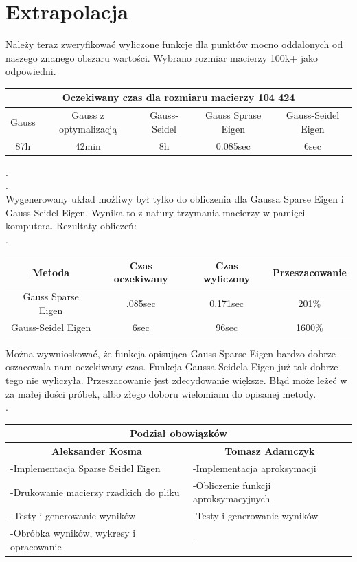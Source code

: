\documentclass[8pt]{article}
\begin{document}
\section*{Extrapolacja}
Należy teraz zweryfikować wyliczone funkcje dla punktów mocno oddalonych od naszego znanego obszaru wartości. Wybrano rozmiar macierzy 100k+ jako odpowiedni.
\begin{center}
\begin{tabular}{ | c | c | c | c | c | }
  \hline
  \multicolumn{5}{|c|}{\textbf{Oczekiwany czas dla rozmiaru macierzy 104 424}} \\
  \hline
  Gauss & Gauss z optymalizacją & Gauss-Seidel &Gauss Sprase Eigen &Gauss-Seidel Eigen \\\hline
  87h & 42min & 8h &0.085sec &6sec \\\hline
  
  \hline
   \hline
\end{tabular}
.\\. \\

Wygenerowany układ możliwy był tylko do obliczenia dla Gaussa Sparse Eigen i Gauss-Seidel Eigen. Wynika to z natury trzymania macierzy w pamięci komputera. Rezultaty obliczeń:\\
.\\
\begin{tabular}{ | c | c | c | c | }
\hline
\hline
  Metoda & Czas oczekiwany & Czas wyliczony & Przeszacowanie\\\hline
   \rowcolor{Lightc}
  Gauss Sparse Eigen & .085sec & 0.171sec & 201\% \\\hline
   \rowcolor{Lightccc}
  Gauss-Seidel Eigen & 6sec & 96sec & 1600\% \\\hline
  
  \hline
\end{tabular}
\end{center}
Można wywnioskować, że funkcja opisująca Gauss Sparse Eigen bardzo dobrze oszacowala nam oczekiwany czas. Funkcja Gaussa-Seidela Eigen już tak dobrze tego nie wyliczyła. Przeszacowanie jest zdecydowanie większe. Błąd może leżeć w za małej ilości próbek, albo złego doboru wielomianu do opisanej metody.\\
.\\

\renewcommand{\arraystretch}{1}
\begin{tabular}{ | p{8.2cm} | p{8.2cm} | }
  \hline
  \multicolumn{2}{|c|}{Podział obowiązków} \\
  \hline
  \multicolumn{1}{|c|}{\textbf{Aleksander Kosma} }& \multicolumn{1}{|c|}{\textbf{Tomasz Adamczyk}} \\
  \hline
  -Implementacja Sparse Seidel Eigen & -Implementacja aproksymacji \\\hline
   -Drukowanie macierzy rzadkich do pliku & -Obliczenie funkcji aproksymacyjnych \\\hline
  -Testy i generowanie wyników & -Testy i generowanie wyników \\\hline
  -Obróbka wyników, wykresy i opracowanie & - \\\hline
  
  \hline
\end{tabular}
\end{document}
